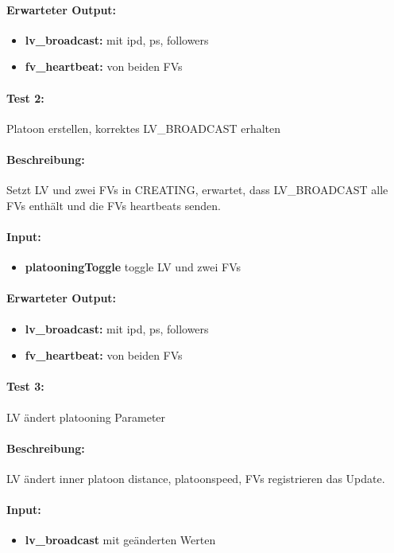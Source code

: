 \documentclass[a4paper, 12pt, titlepage]{scrartcl}
\begin{document}
{			\paragraph{Erwarteter Output:}
			\begin{itemize} \itemsep-0.5em
				\item \textbf{lv\_broadcast:} mit ipd, ps, followers
				\item \textbf{fv\_heartbeat:} von beiden FVs
			\end{itemize}

			\paragraph{Test 2:}{Platoon erstellen, korrektes LV\_BROADCAST erhalten}
			\paragraph{Beschreibung:} Setzt LV und zwei FVs in CREATING, erwartet, dass LV\_BROADCAST alle FVs enthält und die FVs heartbeats senden.
			\paragraph{Input:}
			\begin{itemize} \itemsep-0.5em
				\item \textbf{platooningToggle} toggle LV und zwei FVs 
			\end{itemize}

			\paragraph{Erwarteter Output:}
			\begin{itemize} \itemsep-0.5em
				\item \textbf{lv\_broadcast:} mit ipd, ps, followers
				\item \textbf{fv\_heartbeat:} von beiden FVs
			\end{itemize}

			\paragraph{Test 3:}{LV ändert platooning Parameter}
			\paragraph{Beschreibung:} LV ändert inner platoon distance, platoonspeed, FVs registrieren das Update.
			\paragraph{Input:}
			\begin{itemize} \itemsep-0.5em
				\item \textbf{lv\_broadcast} mit geänderten Werten 
			\end{itemize}

}
\end{document}
